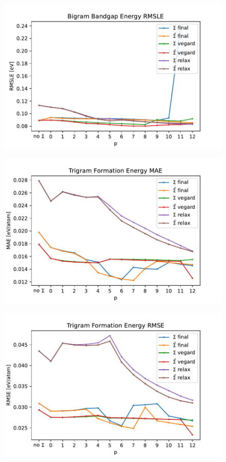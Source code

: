 \documentclass[11pt,oneside,czech,american]{book} %
\theoremstyle{definition} %
\theoremstyle{definition}
\begin{document}
\begin{figure}[H]
	\centering
	\includegraphics[scale=0.6]{bigram_RMSLE_gap.pdf}
	\caption{}
	\label{}
\end{figure}
\begin{figure}[H]
	\centering
	\includegraphics[scale=0.6]{trigram_MAE_form.pdf}
	\caption{}
	\label{}
\end{figure}
\begin{figure}[H]
	\centering
	\includegraphics[scale=0.6]{trigram_RMSE_form.pdf}
	\caption{}
	\label{}
\end{figure}
\end{document}
